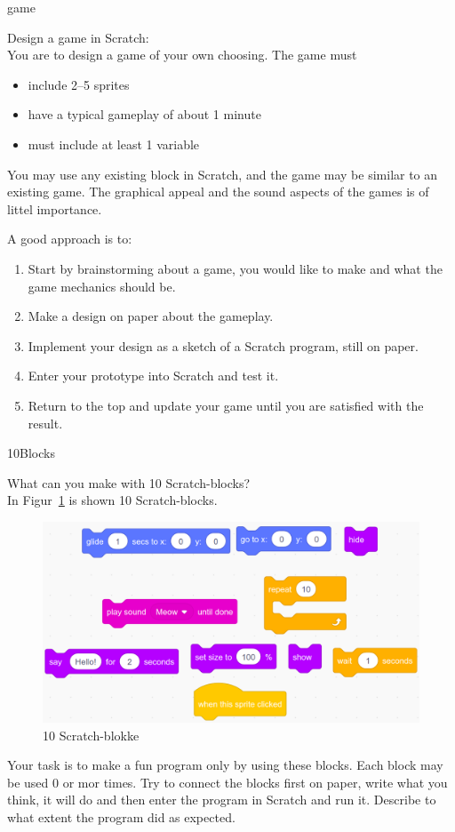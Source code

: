 \begin{defproblem}{game}
  \begin{onlyproblem}%
    Design a game in Scratch:\\
    You are to design a game of your own choosing. The game must
    \begin{itemize}
    \item include 2--5 sprites 
    \item have a typical gameplay of about 1 minute
    \item must include at least 1 variable
    \end{itemize}
    You may use any existing block in Scratch, and the game may be
    similar to an existing game. The graphical appeal and the sound
    aspects of the games is of littel importance.

    A good approach is to:
    \begin{enumerate}
    \item Start by brainstorming about a game, you would like to make
      and what the game mechanics should be.
    \item Make a design on paper about the gameplay.
    \item Implement your design as a sketch of a Scratch program, still on paper.
    \item Enter your prototype into Scratch and test it.
    \item Return to the top and update your game until you are satisfied with the result.
    \end{enumerate}
  \end{onlyproblem}
\end{defproblem}

\begin{defproblem}{10Blocks}
  \begin{onlyproblem}%
    What can you make with 10 Scratch-blocks?\\
    In Figur~\ref{fig:blokke} is shown 10 Scratch-blocks.
    \begin{figure}
      \centering
      \includegraphics[width=0.9\linewidth]{figures/Scratch3.png}
      \caption{10 Scratch-blokke}
      \label{fig:blokke}
    \end{figure}
    Your task is to make a fun program only by using these blocks. Each block may be used 0 or mor times. Try to connect the blocks first on paper, write what you think, it will do and then enter the program in Scratch and run it. Describe to what extent the program did as expected.
  \end{onlyproblem}
\end{defproblem}

